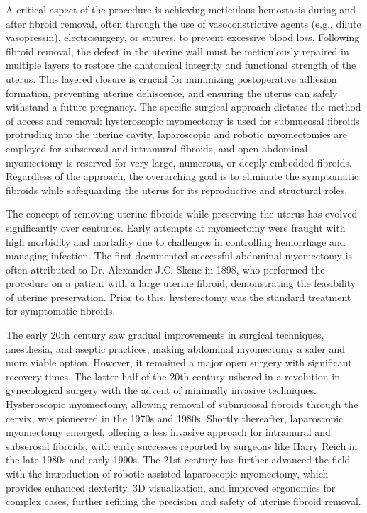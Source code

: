 A critical aspect of the procedure is achieving meticulous hemostasis during and after fibroid removal, often through the use of vasoconstrictive agents (e.g., dilute vasopressin), electrosurgery, or sutures, to prevent excessive blood loss. Following fibroid removal, the defect in the uterine wall must be meticulously repaired in multiple layers to restore the anatomical integrity and functional strength of the uterus. This layered closure is crucial for minimizing postoperative adhesion formation, preventing uterine dehiscence, and ensuring the uterus can safely withstand a future pregnancy. The specific surgical approach dictates the method of access and removal: hysteroscopic myomectomy is used for submucosal fibroids protruding into the uterine cavity, laparoscopic and robotic myomectomies are employed for subserosal and intramural fibroids, and open abdominal myomectomy is reserved for very large, numerous, or deeply embedded fibroids. Regardless of the approach, the overarching goal is to eliminate the symptomatic fibroids while safeguarding the uterus for its reproductive and structural roles.

The concept of removing uterine fibroids while preserving the uterus has evolved significantly over centuries. Early attempts at myomectomy were fraught with high morbidity and mortality due to challenges in controlling hemorrhage and managing infection. The first documented successful abdominal myomectomy is often attributed to Dr. Alexander J.C. Skene in 1898, who performed the procedure on a patient with a large uterine fibroid, demonstrating the feasibility of uterine preservation. Prior to this, hysterectomy was the standard treatment for symptomatic fibroids.

The early 20th century saw gradual improvements in surgical techniques, anesthesia, and aseptic practices, making abdominal myomectomy a safer and more viable option. However, it remained a major open surgery with significant recovery times. The latter half of the 20th century ushered in a revolution in gynecological surgery with the advent of minimally invasive techniques. Hysteroscopic myomectomy, allowing removal of submucosal fibroids through the cervix, was pioneered in the 1970s and 1980s. Shortly thereafter, laparoscopic myomectomy emerged, offering a less invasive approach for intramural and subserosal fibroids, with early successes reported by surgeons like Harry Reich in the late 1980s and early 1990s. The 21st century has further advanced the field with the introduction of robotic-assisted laparoscopic myomectomy, which provides enhanced dexterity, 3D visualization, and improved ergonomics for complex cases, further refining the precision and safety of uterine fibroid removal.

